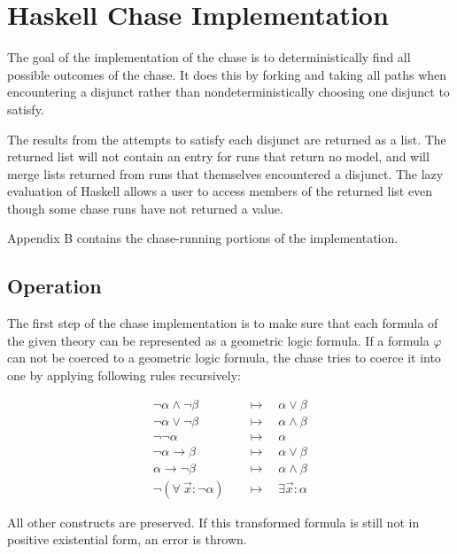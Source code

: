 \section{Haskell Chase Implementation}

	The goal of the implementation of the chase is to deterministically find
	all possible outcomes of the chase. It does this by forking and taking all
	paths when encountering a disjunct rather than nondeterministically
	choosing one disjunct to satisfy.

	The results from the attempts to satisfy each disjunct are returned as a
	list. The returned list will not contain an entry for runs that return no
	model, and will merge lists returned from runs that themselves encountered
	a disjunct. The lazy evaluation of Haskell allows a user to access members
	of the returned list even though some chase runs have not returned a value.

	Appendix B contains the chase-running portions of the implementation.

	\subsection{Operation}

	The first step of the chase implementation is to make sure that each
	formula of the given theory can be represented as a geometric logic
	formula. If a formula $\varphi$ can not be coerced to a geometric logic
	formula, the chase tries to coerce it into one by applying following rules
	recursively:

	\begin{align*}
	\neg\alpha \wedge \neg\beta         \quad & \mapsto \quad \alpha \vee \beta        \\
	\neg\alpha \vee \neg\beta           \quad & \mapsto \quad \alpha \wedge \beta      \\
	\neg\neg\alpha                      \quad & \mapsto \quad \alpha                   \\
	\neg\alpha \to \beta                \quad & \mapsto \quad \alpha \vee \beta        \\
	\alpha \to \neg\beta                \quad & \mapsto \quad \alpha \wedge \beta      \\
	\neg(\forall\ \vec{x} : \neg\alpha) \quad & \mapsto \quad \exists \vec{x} : \alpha
	\end{align*}

	All other constructs are preserved. If this transformed formula is still
	not in positive existential form, an error is thrown.

